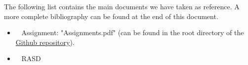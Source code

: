 The following list contains the main documents we have taken as reference. A more complete bibliography can be found at the end of this document.

\begin{itemize}
\item~ Assignment: "Assignments.pdf" (can be found in the root directory of the \href{https://github.com/TommasoBianchi/BettiBianchi_SWENG2}{Github repository}).
\item~ RASD
\end{itemize}